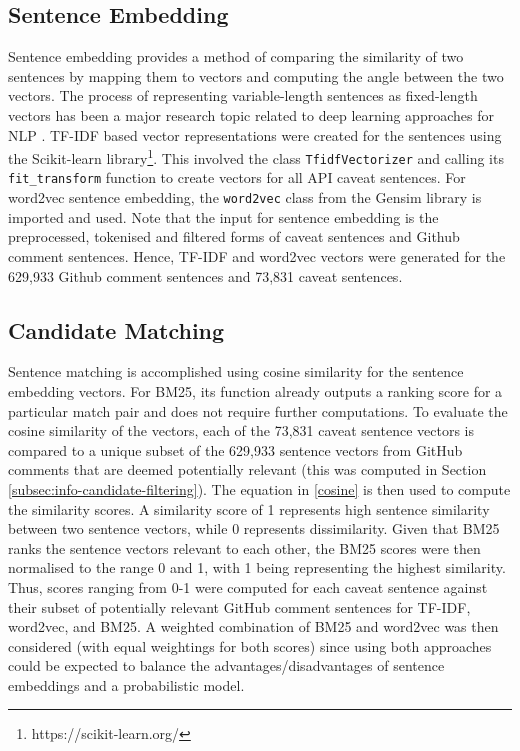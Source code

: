 \subsection{Sentence Embedding}
\label{subsec:info-sentence-embedding}
Sentence embedding provides a method of comparing the similarity of two sentences by mapping them to vectors and computing the angle between the two vectors. The process of representing variable-length sentences as fixed-length vectors has been a major research topic related to deep learning approaches for NLP \cite{adi2016fine}.
TF-IDF based vector representations were created for the sentences using the Scikit-learn library\footnote{https://scikit-learn.org/}. This involved the class \lstinline{TfidfVectorizer} and calling its \lstinline{fit_transform} function to create vectors for all API caveat sentences. For word2vec sentence embedding, the \lstinline{word2vec} class from the Gensim library is imported and used. Note that the input for sentence embedding is the preprocessed, tokenised and filtered forms of caveat sentences and Github comment sentences. Hence, TF-IDF and word2vec vectors were generated for the 629,933 Github comment sentences and 73,831 caveat sentences.

\subsection{Candidate Matching}
\label{subsec:info-candidate-match}
Sentence matching is accomplished using cosine similarity for the sentence embedding vectors. For BM25, its function already outputs a ranking score for a particular match pair and does not require further computations. To evaluate the cosine similarity of the vectors, each of the 73,831 caveat sentence vectors is compared to a unique subset of the 629,933 sentence vectors from GitHub comments that are deemed potentially relevant (this was computed in Section \ref{subsec:info-candidate-filtering}). The equation in \ref{cosine} is then used to compute the similarity scores. A similarity score of 1 represents high sentence similarity between two sentence vectors, while 0 represents dissimilarity. Given that BM25 ranks the sentence vectors relevant to each other, the BM25 scores were then normalised to the range 0 and 1, with 1 being representing the highest similarity. Thus, scores ranging from 0-1 were computed for each caveat sentence against their subset of potentially relevant GitHub comment sentences for TF-IDF, word2vec, and BM25. A weighted combination of BM25 and word2vec was then considered (with equal weightings for both scores) since using both approaches could be expected to balance the advantages/disadvantages of sentence embeddings and a probabilistic model. \\

